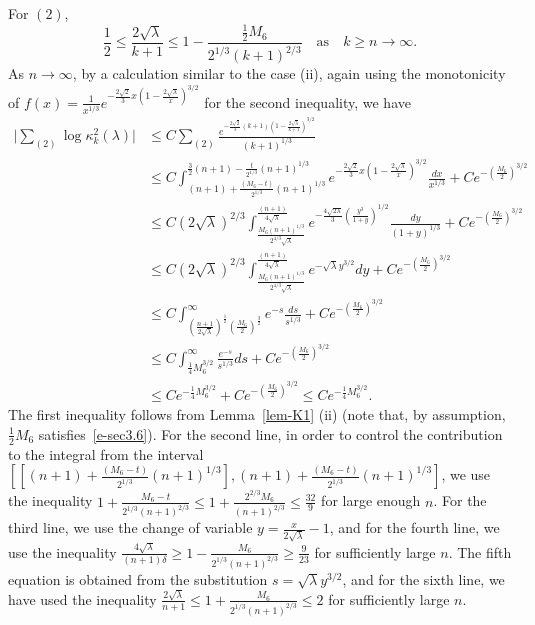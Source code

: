 \documentclass{amsart}
\theoremstyle{definition}
\theoremstyle{remark}
\numberwithin{equation}{section}
\begin{document}
\medskip
For $(2)$, 
\begin{equation*}
   \frac12 \le \frac{2\sqrt\lambda}{k+1} \le 
1-\frac{\frac12M_6}{2^{1/3}(k+1)^{2/3}}\quad 
\text{as}\quad  k\geq n\rightarrow \infty.
\end{equation*}
As $n\to\infty$, by a calculation similar to the case (ii), again using 
the monotonicity of $f(x)=\frac1{x^{1/3}}
e^{-\frac{2\sqrt{2}}{3}x(1-\frac{2\sqrt{\lambda}}{x})^{3/2}}$ 
for the second inequality, 
we have  
\begin{equation*}
  \begin{split}
    \bigl|\sum_{(2)} \log{\kappa^2_{k}}(\lambda) \bigr| 
    &\le C\sum_{(2)} \frac{e^{-\frac{2\sqrt{2}}{3}(k+1)
(1-\frac{2\sqrt{\lambda}}{k+1})^{3/2}}}
{{(k+1)}^{1/3}}\\
    &\le C\int_{(n+1)+\frac{(M_6-t)}{2^{1/3}}{(n+1)}^{1/3}}
^{\frac32(n+1)-\frac{t}{2^{1/3}}(n+1)^{1/3}} 
e^{-\frac{2\sqrt{2}}{3}x(1-\frac{2\sqrt{\lambda}}{x})^{3/2}} 
\frac{dx}{x^{1/3}}
+Ce^{-(\frac{M_6}2)^{3/2}}\\
    &\le C(2\sqrt{\lambda})^{2/3}
\int_{\frac{M_6(n+1)^{1/3}}{2^{4/3}\sqrt{\lambda}}}
^{\frac{(n+1)}{4\sqrt{\lambda}}} 
e^{-\frac{4\sqrt{2\lambda}}{3}(\frac{y^3}{1+y})^{1/2}}
\frac{dy}{(1+y)^{1/3}}
+Ce^{-(\frac{M_6}2)^{3/2}}\\
    &\le C(2\sqrt{\lambda})^{2/3}
\int_{\frac{M_6(n+1)^{1/3}}{2^{4/3}\sqrt{\lambda}}}
^{\frac{(n+1)}{4\sqrt{\lambda}}} 
e^{-\sqrt{\lambda}y^{3/2}} dy
+Ce^{-(\frac{M_6}2)^{3/2}}\\
    &\le C \int_{(\frac{n+1}{2\sqrt{\lambda}})^{\frac12}
(\frac{M_6}{2})^{\frac32}}^{\infty} 
e^{-s} \frac{ds}{s^{1/3}}
+Ce^{-(\frac{M_6}2)^{3/2}}\\
    &\le C\int_{\frac14M_6^{3/2}}^{\infty} \frac{e^{-s}}{s^{1/3}} ds
+Ce^{-(\frac{M_6}2)^{3/2}}\\
    &\le Ce^{-\frac14M_6^{3/2}}
+Ce^{-(\frac{M_6}2)^{3/2}}
\le Ce^{-\frac14M_6^{3/2}}.
  \end{split}
\end{equation*}
The first inequality follows from Lemma~\ref{lem-K1} (ii) (note that, 
by assumption, $\frac12 M_6$ satisfies~\eqref{e-sec3.6}).
For the second line, in order to control the contribution 
to the integral from the interval 
$[[(n+1)+\frac{(M_6-t)}{2^{1/3}}{(n+1)}^{1/3}], 
(n+1)+\frac{(M_6-t)}{2^{1/3}}{(n+1)}^{1/3}]$, we use the inequality 
$1+\frac{M_6-t}{2^{1/3}(n+1)^{2/3}} \le 1+\frac{2^{2/3}M_6}{(n+1)^{2/3}}
\le \frac{32}{9}$ for large enough $n$.
For the third line, we use the change of variable 
$y=\frac{x}{2\sqrt{\lambda}}-1$, and 
for the fourth line, we use the inequality 
$\frac{4\sqrt{\lambda}}{(n+1)\delta} \geq 1-\frac{M_6}{2^{1/3}(n+1)^{2/3}}
\geq \frac9{23}$ for sufficiently large $n$. 
The fifth equation is obtained from the substitution $s=\sqrt{\lambda}y^{3/2}$,
and for the sixth line, we have used the inequality 
$\frac{2\sqrt{\lambda}}{n+1} \le 1+\frac{M_6}{2^{1/3}(n+1)^{2/3}} 
\le 2$ for sufficiently large $n$.
\end{document}
